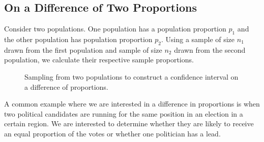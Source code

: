 \subsection{On a Difference of Two Proportions}

Consider two populations. One population has a population proportion $p_{1}$ and the other population has population proportion $p_{2}$.
Using a sample of size $n_1$ drawn from the first population and sample of size $n_2$ drawn from the second population, we calculate their respective sample proportions.

\begin{figure}[H]
\begin{center}
\end{center}
\caption{Sampling from two populations to construct a confidence interval on a difference of proportions.}
\end{figure}

A common example where we are interested in a difference in proportions is when two political candidates are running for the same position in an election in a certain region. We are interested to determine whether they are likely to receive an equal proportion of the votes or whether one politician has a lead.

